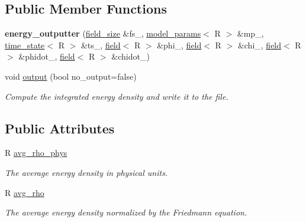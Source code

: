 \subsection*{Public Member Functions}
\begin{DoxyCompactItemize}
\item 
\hypertarget{classenergy__outputter_aa0fa67cec7d405890909d6b600d81508}{
{\bfseries energy\_\-outputter} (\hyperlink{structfield__size}{field\_\-size} \&fs\_\-, \hyperlink{structmodel__params}{model\_\-params}$<$ R $>$ \&mp\_\-, \hyperlink{structtime__state}{time\_\-state}$<$ R $>$ \&ts\_\-, \hyperlink{classfield}{field}$<$ R $>$ \&phi\_\-, \hyperlink{classfield}{field}$<$ R $>$ \&chi\_\-, \hyperlink{classfield}{field}$<$ R $>$ \&phidot\_\-, \hyperlink{classfield}{field}$<$ R $>$ \&chidot\_\-)}
\label{classenergy__outputter_aa0fa67cec7d405890909d6b600d81508}

\item 
void \hyperlink{classenergy__outputter_a51f379bb757589ecf32a074227005c2c}{output} (bool no\_\-output=false)
\begin{DoxyCompactList}\small\item\em Compute the integrated energy density and write it to the file. \item\end{DoxyCompactList}\end{DoxyCompactItemize}
\subsection*{Public Attributes}
\begin{DoxyCompactItemize}
\item 
\hypertarget{classenergy__outputter_ac58a42c4899705ea45ca4b4652203525}{
R \hyperlink{classenergy__outputter_ac58a42c4899705ea45ca4b4652203525}{avg\_\-rho\_\-phys}}
\label{classenergy__outputter_ac58a42c4899705ea45ca4b4652203525}

\begin{DoxyCompactList}\small\item\em The average energy density in physical units. \item\end{DoxyCompactList}\item 
\hypertarget{classenergy__outputter_ac9eefd9359cad3b1a16c829c9d5a8455}{
R \hyperlink{classenergy__outputter_ac9eefd9359cad3b1a16c829c9d5a8455}{avg\_\-rho}}
\label{classenergy__outputter_ac9eefd9359cad3b1a16c829c9d5a8455}

\begin{DoxyCompactList}\small\item\em The average energy density normalized by the Friedmann equation. \item\end{DoxyCompactList}\end{DoxyCompactItemize}

